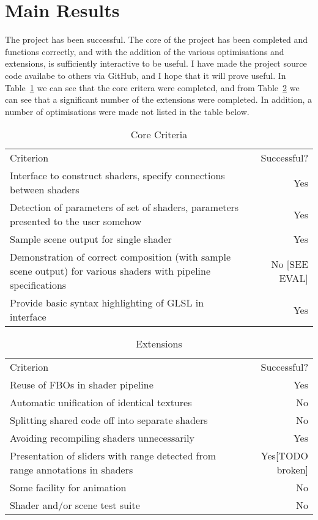 \documentclass[12pt,twoside,notitlepage]{report}
\begin{document}
\section{Main Results}
The project has been successful. The core of the project has been completed and functions correctly, and with the addition of the various optimisations and extensions, is sufficiently interactive to be useful. I have made the project source code availabe to others via GitHub, and I hope that it will prove useful. In Table~\ref{core_t} we can see that the core critera were completed, and from Table~\ref{ext_t} we can see that a significant number of the extensions were completed. In addition, a number of optimisations were made not listed in the table below.

\begin{table}
\begin{tabular}{p{9cm} | r}
Criterion & Successful? \\
Interface to construct shaders, specify connections between shaders & Yes \\
Detection of parameters of set of shaders, parameters presented to the user somehow & Yes \\
Sample scene output for single shader & Yes \\
Demonstration of correct composition (with sample scene output) for various shaders with pipeline specifications & No [SEE EVAL]\\
Provide basic syntax highlighting of GLSL in interface & Yes \\
\end{tabular}
\label{core_t}
\caption{Core Criteria}
\end{table}
\begin{table}
\begin{tabular}{p{9cm} | r}
Criterion & Successful? \\
Reuse of FBOs in shader pipeline & Yes \\
Automatic unification of identical textures & No \footnotemark[1] \\
Splitting shared code off into separate shaders & No \footnotemark[2] \\
Avoiding recompiling shaders unnecessarily & Yes \\
Presentation of sliders with range detected from range annotations in shaders & Yes[TODO broken]\\
Some facility for animation & No \\
Shader and/or scene test suite & No \\
\end{tabular}
\label{ext_t}
\caption{Extensions}
\end{table}
\end{document}
